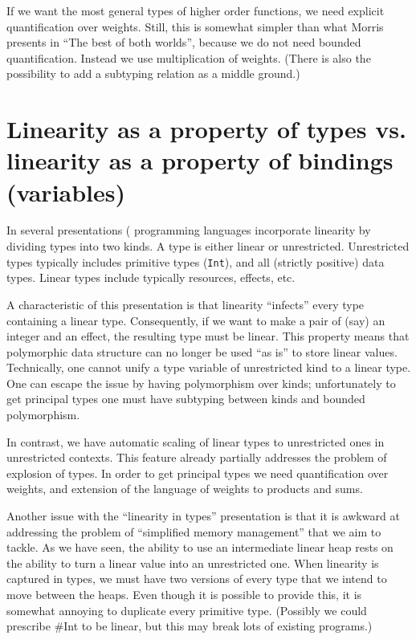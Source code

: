\documentclass[11pt]{article}
\begin{document}
If we want the most general types of higher order functions, we need
explicit quantification over weights. Still, this is somewhat simpler
than what Morris presents in ``The best of both worlds'', because we
do not need bounded quantification. Instead we use multiplication of
weights. (There is also the possibility to add a subtyping relation as
a middle ground.)

\section{Linearity as a property of types vs. linearity as a property of bindings (variables)}

In several presentations (\cite{wadler_linear_1990,mazurak_lightweight_2010,morris_best_2016}
programming languages incorporate
linearity by dividing types into two kinds. A type is either linear
or unrestricted. Unrestricted types typically includes primitive types
(\texttt{Int}), and all (strictly positive) data types. Linear types
include typically resources, effects, etc.

A characteristic of this presentation is that linearity ``infects''
every type containing a linear type. Consequently, if we want to make
a pair of (say) an integer and an effect, the resulting type must be
linear. This property means that polymorphic data structure can no
longer be used ``as is'' to store linear values. Technically, one
cannot unify a type variable of unrestricted kind to a linear
type. One can escape the issue by having polymorphism over kinds;
unfortunately to get principal types one must have subtyping between
kinds and bounded polymorphism.

In contrast, we have automatic scaling of linear types to unrestricted
ones in unrestricted contexts. This feature already partially
addresses the problem of explosion of types. In order to get principal
types we need quantification over weights, and extension of the
language of weights to products and sums.

Another issue with the ``linearity in types'' presentation is that it
is awkward at addressing the problem of ``simplified memory
management'' that we aim to tackle. As we have seen, the ability to
use an intermediate linear heap rests on the ability to turn a linear
value into an unrestricted one. When linearity is captured in types,
we must have two versions of every type that we intend to move between
the heaps. Even though it is possible to provide this, it is somewhat
annoying to duplicate every primitive type. (Possibly we could
prescribe \#Int to be linear, but this may break lots of existing
programs.)
\end{document}
